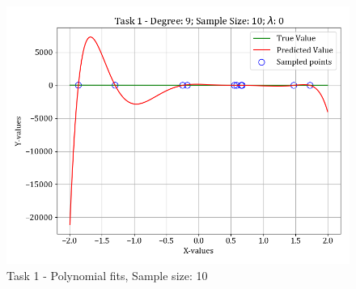 \documentclass[12pt,a4paper]{article}
\begin{document}
\begin{figure}[H]
    \includegraphics[scale=0.425]{images/t1_d1/d_9_size_10_l_0.png}
    \caption{Task 1 - Polynomial fits, Sample size: 10}
\end{figure}
\end{document}
